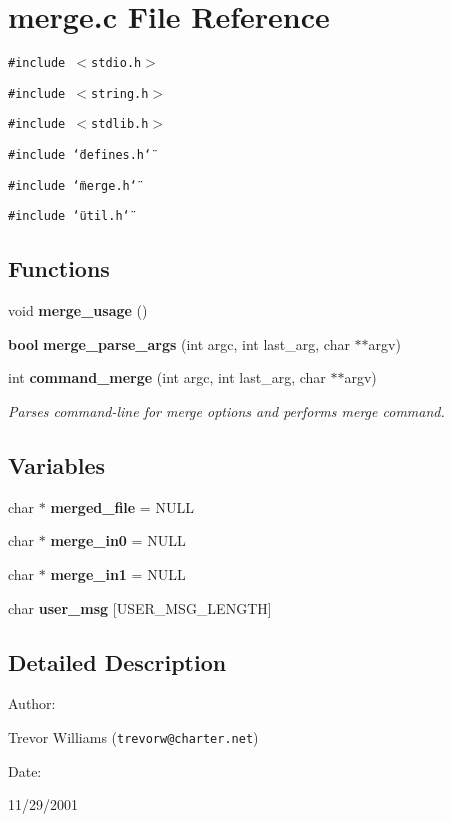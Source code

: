 \section{merge.c File Reference}
\label{merge_8c}
{\tt \#include $<$stdio.h$>$}\par
{\tt \#include $<$string.h$>$}\par
{\tt \#include $<$stdlib.h$>$}\par
{\tt \#include \char`\"{}defines.h\char`\"{}}\par
{\tt \#include \char`\"{}merge.h\char`\"{}}\par
{\tt \#include \char`\"{}util.h\char`\"{}}\par
\subsection*{Functions}
\begin{CompactItemize}
\item 
void {\bf merge\_\-usage} ()
\item 
{\bf bool} {\bf merge\_\-parse\_\-args} (int argc, int last\_\-arg, char $\ast$$\ast$argv)
\item 
int {\bf command\_\-merge} (int argc, int last\_\-arg, char $\ast$$\ast$argv)
\begin{CompactList}\small\item\em Parses command-line for merge options and performs merge command.\item\end{CompactList}\end{CompactItemize}
\subsection*{Variables}
\begin{CompactItemize}
\item 
char $\ast$ {\bf merged\_\-file} = NULL
\item 
char $\ast$ {\bf merge\_\-in0} = NULL
\item 
char $\ast$ {\bf merge\_\-in1} = NULL
\item 
char {\bf user\_\-msg} [USER\_\-MSG\_\-LENGTH]
\end{CompactItemize}


\subsection{Detailed Description}


\begin{Desc}
\item[Author: ]\par
Trevor Williams ({\tt trevorw@charter.net}) \end{Desc}
\begin{Desc}
\item[Date: ]\par
11/29/2001\end{Desc}


